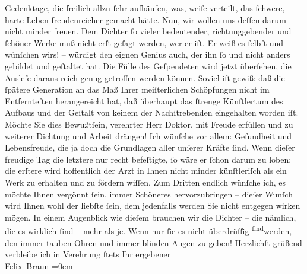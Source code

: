 \begin{ledgroupsized}[t]{13cm}
               Gedenktage, die freilich allzu ſehr aufhäufen, was, weiſe verteilt, das ſchwere,
               harte Leben freudenreicher gemacht hätte. Nun, wir wollen uns deſſen darum nicht
               minder freuen.\pend
           \pstart
           {\pb}Dem Dichter ſo vieler bedeutender, richtunggebender
               und ſchöner Werke muß nicht erſt geſagt werden, wer er iſt. Er weiß es ſelbſt und –
               wünſchen wirs! – würdigt den eignen Genius auch, der ihn ſo und nicht anders gebildet
               und geſtaltet hat. Die Fülle des Geſpendeten wird jetzt überſehen, die Ausleſe daraus
               reich genug getroffen werden können. Soviel iſt gewiß: daß die ſpätere Generation an
               das Maß Ihrer meiſterlichen Schöpfungen nicht im Entfernteſten herangereicht hat, daß
               überhaupt das ſtrenge Künſtlertum des Aufbaus und der Geſtalt von keinem der
               Nachſtrebenden eingehalten worden iſt. Möchte Sie dies Bewußtſein, verehrter Herr
               Doktor, mit Freude erfüllen und zu weiterer Dichtung und Arbeit drängen!\pend
           \pstart
           Ich wünſche vor allem: Geſundheit und Lebensfreude, die ja doch die Grundlagen aller
               unſerer Kräfte ſind. Wenn dieſer freudige {\pb}Tag die
               letztere nur recht befeſtigte, ſo wäre er ſchon darum zu loben; die erſtere wird
               hoffentlich der Arzt in Ihnen nicht minder künſtleriſch als ein Werk zu erhalten und
               zu fördern wiſſen. Zum Dritten endlich wünſche ich, es möchte Ihnen vergönnt ſein,
               immer Schöneres hervorzubringen – dieſer Wunſch wird Ihnen wohl der liebſte ſein, dem
               jedenfalls werden Sie nicht entgegen wirken mögen. In einem Augenblick wie dieſem
               brauchen wir die Dichter – die nämlich, die es wirklich ſind – mehr als je. Wenn nur
               ſie es nicht überdrüſſig \substVorne{}\textsuperscript{ſind}\substDazwischen{}werden\substHinten{}, den immer tauben Ohren und immer blinden Augen zu geben!\pend
           \pstart
           Herzlichſt grüßend verbleibe ich in Verehrung ſtets Ihr ergebener{\\[\baselineskip]}\spacefill\mbox{Felix Braun}\pend
           \leftskip=0em{}
         
         \endnumbering{}\end{ledgroupsized}  \newcommand{\dateiname}{L02381}\newcommand{\titel}{Felix Braun an Arthur Schnitzler, 13. 5. 1922}\newcommand{\editorInnen}{Martin Anton Müller und Gerd-Hermann Susen}
      